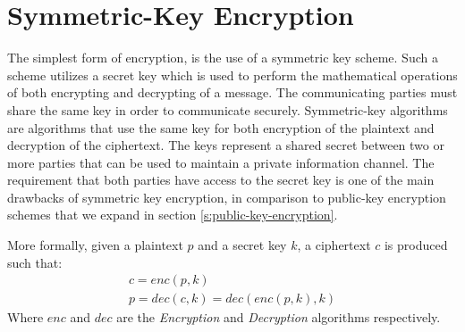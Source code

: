 \section{Symmetric-Key Encryption}\label{s:symmetric-key-encryption}
The simplest form of encryption, is the use of a symmetric key scheme. Such a scheme utilizes a secret key which is used to perform the mathematical operations of both encrypting and decrypting of a message.
The communicating parties must share the same key in order to communicate securely.
Symmetric-key algorithms are algorithms that use the same key for both encryption of the plaintext and decryption of the ciphertext.
The keys represent a shared secret between two or more parties that can be used to maintain a private information channel.
The requirement that both parties have access to the secret key is one of the main drawbacks of symmetric key encryption, in comparison to public-key encryption schemes that we expand in section \ref{s:public-key-encryption}.

More formally, given a plaintext $p$ and a secret key $k$, a ciphertext $c$ is produced such that:
\begin{equation}
  \label{eq:symmetric-key-encryption}
  \begin{aligned}
    c = enc(p, k)\\
    p = dec(c, k) = dec(enc(p, k), k)
  \end{aligned}
  \end{equation}
Where $enc$ and $dec$ are the \textit{Encryption} and \textit{Decryption} algorithms respectively.
